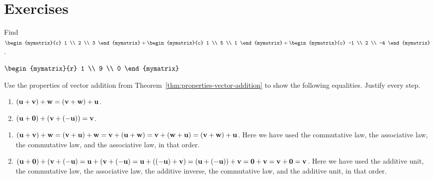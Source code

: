\section*{Exercises}

\begin{enumialphparenastyle}

\begin{ex}
  Find $\begin{mymatrix}{c}
    1 \\
    2 \\
    3
  \end{mymatrix} +\begin{mymatrix}{c}
    1 \\
    5 \\
    1
  \end{mymatrix} +\begin{mymatrix}{c}
    -1 \\
    2 \\
    -4
  \end{mymatrix}$.
  
  \begin{sol}
    $\begin{mymatrix}{r}
      1 \\
      9 \\
      0
    \end{mymatrix}$
  \end{sol}
\end{ex}

\begin{ex}
  Use the properties of vector addition from
  Theorem~\ref{thm:properties-vector-addition} to show the following
  equalities. Justify every step. 
  \begin{enumerate}
  \item $(\mbox{\bf u}+\mbox{\bf v})+\mbox{\bf w} = (\mbox{\bf v}+\mbox{\bf w})+\mbox{\bf u}$.
  \item $(\mbox{\bf u}+\mbox{\bf 0})+(\mbox{\bf v}+(-\mbox{\bf u})) = \mbox{\bf v}$.
  \end{enumerate}

  \begin{sol}
    \begin{enumerate}
    \item
      $(\mbox{\bf u}+\mbox{\bf v})+\mbox{\bf w} = (\mbox{\bf v}+\mbox{\bf u})+\mbox{\bf w} =
      \mbox{\bf v}+(\mbox{\bf u}+\mbox{\bf w}) = \mbox{\bf v}+(\mbox{\bf w}+\mbox{\bf u}) =
      (\mbox{\bf v}+\mbox{\bf w})+\mbox{\bf u}$. Here we have used the commutative
      law, the associative law, the commutative law, and the
      associative law, in that order.
    \item
      $(\mbox{\bf u}+\mbox{\bf 0})+(\mbox{\bf v}+(-\mbox{\bf u}) =
      \mbox{\bf u}+(\mbox{\bf v}+(-\mbox{\bf u}) = \mbox{\bf u}+((-\mbox{\bf u})+\mbox{\bf v})
      = (\mbox{\bf u}+(-\mbox{\bf u}))+\mbox{\bf v} = \mbox{\bf 0}+\mbox{\bf v} =
      \mbox{\bf v}+\mbox{\bf 0} = \mbox{\bf v}$. Here we have used the additive
      unit, the commutative law, the associative law, the additive
      inverse, the commutative law, and the additive unit, in that
      order.
    \end{enumerate}
  \end{sol}
\end{ex}

\end{enumialphparenastyle}
